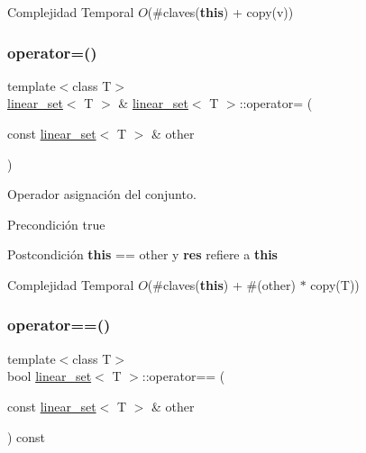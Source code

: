 \begin{DoxyDescription}
\item[Complejidad Temporal]$O$(\#claves({\bfseries this}) + copy(v))
\end{DoxyDescription}\mbox{\label{classlinear__set_a5bea24f94c4ea45550ec4b066ffb8cf1}} 
\subsubsection{\texorpdfstring{operator=()}{operator=()}}
{\footnotesize\ttfamily template$<$class T$>$ \\
\mbox{\hyperlink{classlinear__set}{linear\+\_\+set}}$<$ T $>$ \& \mbox{\hyperlink{classlinear__set}{linear\+\_\+set}}$<$ T $>$\+::operator= (\begin{DoxyParamCaption}\item[{const \mbox{\hyperlink{classlinear__set}{linear\+\_\+set}}$<$ T $>$ \&}]{other }\end{DoxyParamCaption})}



Operador asignación del conjunto. 

\begin{DoxyPrecond}{Precondición}
true 
\end{DoxyPrecond}
\begin{DoxyPostcond}{Postcondición}
{\bfseries this} == other y {\bfseries res} refiere a {\bfseries this}
\end{DoxyPostcond}

\begin{DoxyDescription}
\item[Complejidad Temporal]$O$(\#claves({\bfseries this}) + \#(other) $\ast$ copy(\+T))
\end{DoxyDescription}\mbox{\label{classlinear__set_a49b9debdaaca2478d5df6c1f0fffab33}} 
\subsubsection{\texorpdfstring{operator==()}{operator==()}}
{\footnotesize\ttfamily template$<$class T$>$ \\
bool \mbox{\hyperlink{classlinear__set}{linear\+\_\+set}}$<$ T $>$\+::operator== (\begin{DoxyParamCaption}\item[{const \mbox{\hyperlink{classlinear__set}{linear\+\_\+set}}$<$ T $>$ \&}]{other }\end{DoxyParamCaption}) const}




